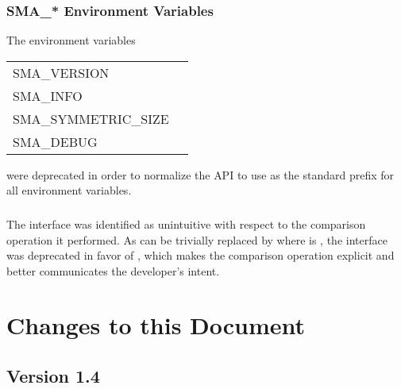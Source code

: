 \subsection{SMA\_* Environment Variables}
The environment variables
\begin{center}
\begin{tabular}{ll}
    SMA\_VERSION \\
    SMA\_INFO \\
    SMA\_SYMMETRIC\_SIZE \\
    SMA\_DEBUG \\
\end{tabular}
\end{center}
were deprecated in order to normalize the \openshmem \ac{API} to use
\shmemprefix{} as the standard prefix for all environment variables.

\subsection{}
The  interface was identified as unintuitive with respect to
the comparison operation it performed.  As  can be trivially
replaced by  where  is
, the  interface was deprecated in
favor of , which makes the comparison operation
explicit and better communicates the developer's intent.





\chapter{Changes to this Document}\label{sec:changelog}

\section{Version 1.4}

